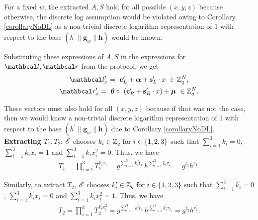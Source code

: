 For a fixed $w$, the extracted $A, S$ hold for all possible $(x,y,z)$ because otherwise, the discrete log assumption would be violated owing to Corollary \ref{corollaryNoDL} as a non-trivial discrete logarithm representation of $1$ with respect to the base $(h^{\prime}\| \textbf{g}_w \| \textbf{h})$ would be known.

Substituting these expressions of $A, S$ in the expressions for $\lvec, \rvec$ from the protocol, we get
\begin{gather*}
    \lvec_x^{\prime} = \ \textbf{c}_L^{\prime} + \vecnb{\alpha} + \textbf{s}_L^{\prime} \cdot x \ \in \Z_q^N, \\
    \rvec_x^{\prime} = \ \vecnb{\theta} \circ \ (\textbf{c}_R^{\prime} + \textbf{s}_R^{\prime} \cdot x) + \vecnb{\mu} \ \in \Z^N_q.
\end{gather*}

These vectors must also hold for all $(x,y,z)$ because if that was not the case, then we would know a non-trivial discrete logarithm representation of $1$ with respect to the base $(h^{\prime}\| \textbf{g}_w \| \textbf{h})$ due to Corollary \ref{corollaryNoDL}.\\



\noindent
\textbf{Extracting $T_1,T_2$}:  $\mathscr{E}$ chooses $k_i \in \mathbb{Z}_q \text{ for } i \in \{1,2,3\}$ such that $\sum_{i=1}^{3}k_i=0$, $\sum_{i=1}^{3}k_ix_i=1$ and $\sum_{i=1}^{3}k_ix_i^2=0$. Thus, we have
\begin{gather*}
    T_1 = \prod_{i=1}^{3} T_1^{k_ix_i} = g^{\sum_{i=1}^{3} k_i \hat{t}_{x_i}} h^{\sum_{i=1}^{3} k_i \tau_{x_i}} = g^{t_1^{\prime}} h^{r_1^{\prime}}.
\end{gather*}

Similarly, to extract $T_2$, $\mathscr{E}$ chooses $k_i^{\prime} \in \mathbb{Z}_q \text{ for } i \in \{1,2,3\}$ such that $\sum_{i=1}^{3}k_i^{\prime}=0$, $\sum_{i=1}^{3}k_i^{\prime}x_i=0$ and $\sum_{i=1}^{3}k_i^{\prime}x_i^2=1$. Thus, we have
\begin{gather*}
    T_2 = \prod_{i=1}^{3} T_2^{k_i^{\prime} x_i^2} = g^{\sum_{i=1}^{3} k_i^{\prime} \hat{t}_{x_i}} h^{\sum_{i=1}^{3} k_i^{\prime} \tau_{x_i}} = g^{t_2^{\prime}} h^{r_2^{\prime}}.
\end{gather*}


